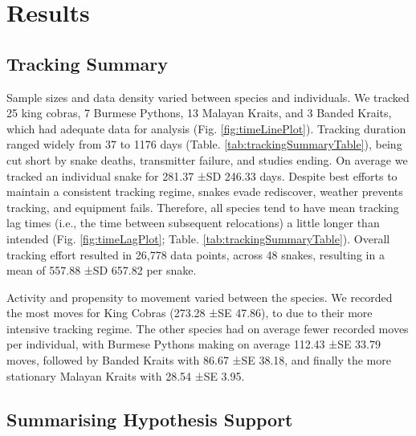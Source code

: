 \documentclass[10pt,a4paper]{article}
\begin{document}
\section{Results}\label{results}

\subsection{Tracking Summary}\label{tracking-summary}

Sample sizes and data density varied between species and individuals.
We tracked 25 king cobras, 7 Burmese Pythons, 13 Malayan Kraits, and 3 Banded Kraits, which had adequate data for analysis (Fig. \ref{fig:timeLinePlot}).
Tracking duration ranged widely from 37 to 1176 days (Table. \ref{tab:trackingSummaryTable}), being cut short by snake deaths, transmitter failure, and studies ending.
On average we tracked an individual snake for 281.37 ±SD 246.33 days.
Despite best efforts to maintain a consistent tracking regime, snakes evade rediscover, weather prevents tracking, and equipment fails.
Therefore, all species tend to have mean tracking lag times (i.e., the time between subsequent relocations) a little longer than intended (Fig. \ref{fig:timeLagPlot}; Table. \ref{tab:trackingSummaryTable}).
Overall tracking effort resulted in 26,778 data points, across 48 snakes, resulting in a mean of 557.88 ±SD 657.82 per snake.

Activity and propensity to movement varied between the species.
We recorded the most moves for King Cobras (273.28 ±SE 47.86), to due to their more intensive tracking regime.
The other species had on average fewer recorded moves per individual, with Burmese Pythons making on average 112.43 ±SE 33.79 moves, followed by Banded Kraits with 86.67 ±SE 38.18, and finally the more stationary Malayan Kraits with 28.54 ±SE 3.95.

\subsection{Summarising Hypothesis Support}\label{summarising-hypothesis-support}
\end{document}
